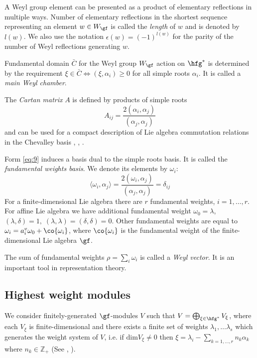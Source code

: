 A Weyl group element can be presented as a product of elementary reflections in multiple ways. Number of elementary reflections in the shortest sequence representing an element $w\in W_{\gf}$ is called the {\it length} of $w$ and is denoted by $l(w)$. We also use the notation $\epsilon(w)=(-1)^{l(w)}$ for the parity of the number of Weyl reflections generating $w$. 

Fundamental domain $\bar{C}$ for the Weyl group $W_{\gf}$ action  on $\hfg^{*}$ is determined by the requirement $\xi\in \bar{C}\Leftrightarrow (\xi,\alpha_{i})\geq 0$ for all simple roots $\alpha_{i}$. It is called a {\it main Weyl chamber}. 

The {\it Cartan matrix} $A$ is defined by products of simple roots
\begin{equation}
  \label{eq:9}
  A_{ij}=\frac{2(\alpha_{i},\alpha_{j})}{(\alpha_{j},\alpha_{j})}
\end{equation}
and can be used for a compact description of Lie algebra commutation relations in the Chevalley basis \cite{humphreys1997introduction}, \cite{fulton1991representation}, \cite{bourbaki2002lie}.

Form \eqref{eq:9} induces a basis dual  to the simple
roots basis. It is called the {\it fundamental weights basis}. We denote
its elements by $\omega_i$:
\begin{equation}
  \label{eq:20}
  \langle\omega_i,\alpha_j\rangle=\frac{2(\omega_{i},\alpha_{j})}{(\alpha_{j},\alpha_{j})}=\delta_{ij}
\end{equation}
For a finite-dimensional Lie algebra there are $r$ fundamental weights, $i=1,\dots, r$. For affine Lie algebra we have additional fundamental weight $\omega_0=\lambda$, $(\lambda,\delta)=1, \; (\lambda,\lambda)=(\delta,\delta)=0$. Other fundamental weights are equal to $\omega_i=a_i^v \omega_0 +\co{\omega_i}$, where $\co{\omega_i}$ is the fundamental weight of the finite-dimensional Lie algebra $\gf$.

 The sum of fundamental weights $\rho=\sum_{i} \omega_{i}$ is called a {\it Weyl vector}. It is an important tool in representation theory.

\subsection{Highest weight modules}
\label{sec:high-weight-modul}

We consider finitely-generated $\gf$-modules $V$ such that $V=\bigoplus_{\xi\in \hfg^{*}} V_{\xi}$, where each $V_{\xi}$ is finite-dimensional and there exists a finite set of weights $\lambda_{1},\dots \lambda_{s}$ which generates the weight system of $V$, i.e. if $\mathrm{dim}V_{\xi}\neq 0$ then $\xi=\lambda_{i}-\sum_{k=1,\dots, r} n_{k}\alpha_{k}$ where $n_{k}\in \mathbb{Z}_{+}$ (See \cite{humphreys2008representations}, \cite{carter2005lie}).

